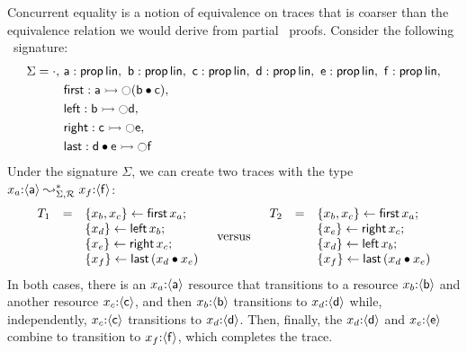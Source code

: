 Concurrent equality is a notion of equivalence on traces that is
coarser than the equivalence relation we would derive from partial
\ollll~proofs. Consider the following \sls~signature:
\begin{align*}
 \Sigma = \cdot, 
~&{\sf a} : {\sf prop}\,{\sf lin},
~ {\sf b} : {\sf prop}\,{\sf lin},
~ {\sf c} : {\sf prop}\,{\sf lin},
~ {\sf d} : {\sf prop}\,{\sf lin},
~ {\sf e} : {\sf prop}\,{\sf lin},
~ {\sf f} : {\sf prop}\,{\sf lin},
\\ & 
  {\sf first}  : {\sf a} \rightarrowtail {\ocircle}({\sf b} \mathbin{\bullet} {\sf c}), 
\\ &
  {\sf left}  : {\sf b} \rightarrowtail {\ocircle}{\sf d}, ~
\\ &
  {\sf right} : {\sf c} \rightarrowtail {\ocircle}{\sf e}, ~
\\ &
  {\sf last} : {\sf d} \mathbin{\bullet} {\sf e} \rightarrowtail {\ocircle}{\sf f}
\end{align*}
Under the signature $\Sigma$,
we can create two traces with the type
$x_a{:}\langle {\sf a} \rangle \leadsto^*_{\Sigma,\mathcal R} x_f{:}\langle {\sf f} \rangle$:
\[
\begin{array}{rcl}
T_1 & = 
 & \{{x_b, x_c}\} \leftarrow {\sf first}\,x_a;\\
&& \{{x_d}\} \leftarrow {\sf left}\,x_b;\\
&& \{{x_e}\} \leftarrow {\sf right}\,x_c;\\
&& \{{x_f}\} \leftarrow {\sf last}\,({x_d} \mathbin{\bullet} {x_e})
\end{array}
\quad
\mbox{versus}
\quad
\begin{array}{rcl}
T_2 & = 
 & \{{x_b, x_c}\} \leftarrow {\sf first}\,x_a;\\
&& \{{x_e}\} \leftarrow {\sf right}\,x_c;\\
&& \{{x_d}\} \leftarrow {\sf left}\,x_b;\\
&& \{{x_f}\} \leftarrow {\sf last}\,({x_d} \mathbin{\bullet} {x_e})
\end{array}
\]
In both cases, there is an $x_a{:}\langle {\sf a} \rangle$ resource
that transitions to a resource $x_b{:}\langle {\sf b} \rangle$ and another resource
$x_c{:}\langle {\sf c} \rangle$, and then $x_b{:}\langle {\sf b} \rangle$
transitions to $x_d{:}\langle {\sf d} \rangle$ while, independently,
$x_c{:}\langle {\sf c} \rangle$ transitions to $x_d{:}\langle {\sf d} \rangle$. Then,
finally, the $x_d{:}\langle {\sf d} \rangle$ and $x_e{:}\langle {\sf e} \rangle$ combine to
transition to $x_f{:}\langle {\sf f} \rangle$, which completes the trace. 

